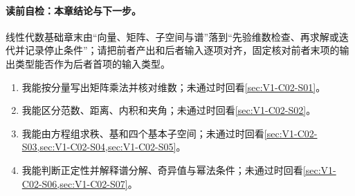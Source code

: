 \paragraph{读前自检：本章结论与下一步。}线性代数基础章末由“向量、矩阵、子空间与谱”落到“先验维数检查、再求解或迭代并记录停止条件”；请把前者产出和后者输入逐项对齐，固定核对前者末项的输出类型能否作为后者首项的输入类型。\par

\begin{SLCompactClosure}
\label{schema:V1-C02:CH-36}
\begin{selfcheckbox}\label{schema:V1-C02:CH-37}
\begin{enumerate}[leftmargin=2em]
  \item 我能按分量写出矩阵乘法并核对维数；未通过时回看\cref{sec:V1-C02-S01}。
  \item 我能区分范数、距离、内积和夹角；未通过时回看\cref{sec:V1-C02-S02}。
  \item 我能由方程组求秩、基和四个基本子空间；未通过时回看\cref{sec:V1-C02-S03,sec:V1-C02-S04,sec:V1-C02-S05}。
  \item 我能判断正定性并解释谱分解、奇异值与幂法条件；未通过时回看\cref{sec:V1-C02-S06,sec:V1-C02-S07}。
\end{enumerate}
\end{selfcheckbox}
\end{SLCompactClosure}
